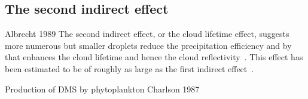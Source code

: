 \subsection{The second indirect effect}
Albrecht 1989 
The second indirect effect, or the cloud lifetime effect, suggests more numerous but smaller droplets reduce the precipitation efficiency and by that enhances the cloud lifetime and hence the cloud reflectivity~\citep{Albrecht1989}. This effect has been estimated to be of roughly as large as the first indirect effect~\citep{Lohmann2005}.


Production of DMS by phytoplankton Charlson 1987


